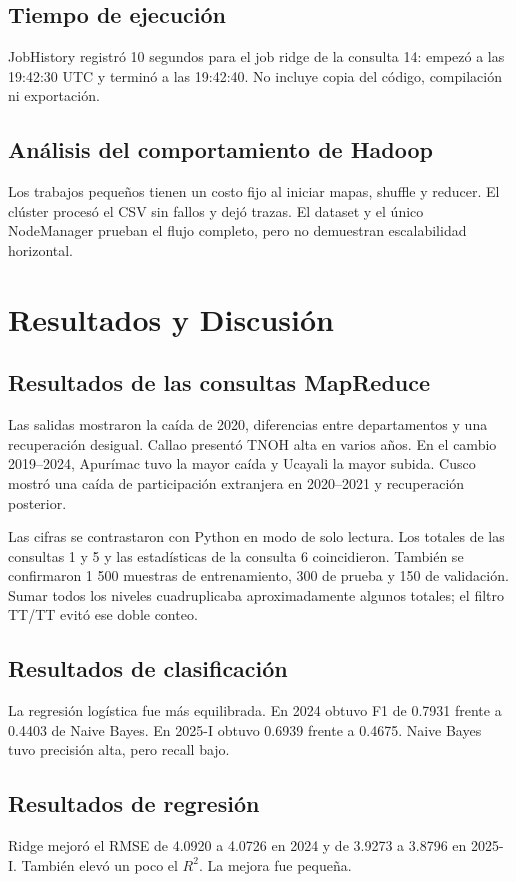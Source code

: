 \documentclass[10pt,a4paper]{article}
\theoremstyle{definition}
\begin{document}
\subsection{Tiempo de ejecución}
JobHistory registró 10 segundos para el job ridge de la consulta 14: empezó a
las 19:42:30 UTC y terminó a las 19:42:40. No incluye copia del código,
compilación ni exportación.

\subsection{Análisis del comportamiento de Hadoop}
Los trabajos pequeños tienen un costo fijo al iniciar mapas, shuffle y reducer.
El clúster procesó el CSV sin fallos y dejó trazas. El dataset y el único
NodeManager prueban el flujo completo, pero no demuestran escalabilidad
horizontal.

\section{Resultados y Discusión}
\subsection{Resultados de las consultas MapReduce}
Las salidas mostraron la caída de 2020, diferencias entre departamentos y una
recuperación desigual. Callao presentó TNOH alta en varios años. En el cambio
2019--2024, Apurímac tuvo la mayor caída y Ucayali la mayor subida. Cusco mostró
una caída de participación extranjera en 2020--2021 y recuperación posterior.

Las cifras se contrastaron con Python en modo de solo lectura. Los totales de
las consultas 1 y 5 y las estadísticas de la consulta 6 coincidieron. También
se confirmaron 1 500 muestras de entrenamiento, 300 de prueba y 150 de
validación. Sumar todos los niveles cuadruplicaba aproximadamente algunos
totales; el filtro TT/TT evitó ese doble conteo.

\subsection{Resultados de clasificación}
La regresión logística fue más equilibrada. En 2024 obtuvo F1 de 0.7931 frente
a 0.4403 de Naive Bayes. En 2025-I obtuvo 0.6939 frente a 0.4675. Naive Bayes
tuvo precisión alta, pero recall bajo.

\subsection{Resultados de regresión}
Ridge mejoró el RMSE de 4.0920 a 4.0726 en 2024 y de 3.9273 a 3.8796 en
2025-I. También elevó un poco el $R^2$. La mejora fue pequeña.
\end{document}
